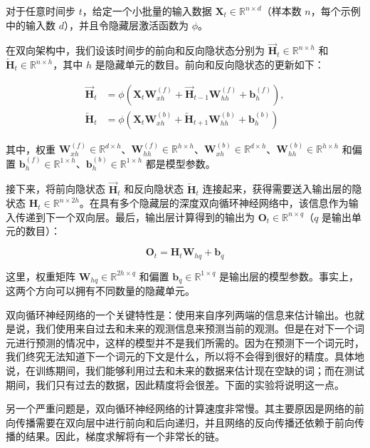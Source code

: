 对于任意时间步 \(t\)，给定一个小批量的输入数据 \(\mathbf{X}_t \in \mathbb{R}^{n \times d}\)（样本数 \(n\)，每个示例中的输入数 \(d\)），并且令隐藏层激活函数为 \(\phi\)。

在双向架构中，我们设该时间步的前向和反向隐状态分别为 \(\overrightarrow{\mathbf{H}}_t \in \mathbb{R}^{n \times h}\) 和 \(\overleftarrow{\mathbf{H}}_t \in \mathbb{R}^{n \times h}\)，其中 \(h\) 是隐藏单元的数目。前向和反向隐状态的更新如下：

\[
\begin{aligned}
\overrightarrow{\mathbf{H}}_t &= \phi(\mathbf{X}_t\mathbf{W}_{xh}^{(f)} + \overrightarrow{\mathbf{H}}_{t-1}\mathbf{W}_{hh}^{(f)} + \mathbf{b}_h^{(f)}), \\
\overleftarrow{\mathbf{H}}_t &= \phi(\mathbf{X}_t\mathbf{W}_{xh}^{(b)} + \overleftarrow{\mathbf{H}}_{t+1}\mathbf{W}_{hh}^{(b)} + \mathbf{b}_h^{(b)})
\end{aligned}
\]

其中，权重 \(\mathbf{W}_{xh}^{(f)} \in \mathbb{R}^{d \times h}\)、\(\mathbf{W}_{hh}^{(f)} \in \mathbb{R}^{h \times h}\)、\(\mathbf{W}_{xh}^{(b)} \in \mathbb{R}^{d \times h}\)、\(\mathbf{W}_{hh}^{(b)} \in \mathbb{R}^{h \times h}\) 和偏置 \(\mathbf{b}_h^{(f)} \in \mathbb{R}^{1 \times h}\)、\(\mathbf{b}_h^{(b)} \in \mathbb{R}^{1 \times h}\) 都是模型参数。

接下来，将前向隐状态 \(\overrightarrow{\mathbf{H}}_t\) 和反向隐状态 \(\overleftarrow{\mathbf{H}}_t\) 连接起来，获得需要送入输出层的隐状态 \(\mathbf{H}_t \in \mathbb{R}^{n \times 2h}\)。在具有多个隐藏层的深度双向循环神经网络中，该信息作为输入传递到下一个双向层。最后，输出层计算得到的输出为 \(\mathbf{O}_t \in \mathbb{R}^{n \times q}\)（\(q\) 是输出单元的数目）：

\[
\mathbf{O}_t = \mathbf{H}_t\mathbf{W}_{hq} + \mathbf{b}_q
\]

这里，权重矩阵 \(\mathbf{W}_{hq} \in \mathbb{R}^{2h \times q}\) 和偏置 \(\mathbf{b}_q \in \mathbb{R}^{1 \times q}\) 是输出层的模型参数。事实上，这两个方向可以拥有不同数量的隐藏单元。

双向循环神经网络的一个关键特性是：使用来自序列两端的信息来估计输出。也就是说，我们使用来自过去和未来的观测信息来预测当前的观测。但是在对下一个词元进行预测的情况中，这样的模型并不是我们所需的。因为在预测下一个词元时，我们终究无法知道下一个词元的下文是什么，所以将不会得到很好的精度。具体地说，在训练期间，我们能够利用过去和未来的数据来估计现在空缺的词；而在测试期间，我们只有过去的数据，因此精度将会很差。下面的实验将说明这一点。

另一个严重问题是，双向循环神经网络的计算速度非常慢。其主要原因是网络的前向传播需要在双向层中进行前向和后向递归，并且网络的反向传播还依赖于前向传播的结果。因此，梯度求解将有一个非常长的链。

